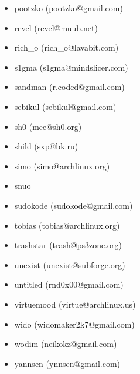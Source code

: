 \begin{itemize}
\item  pootzko (pootzko@gmail.com)
\item  revel (revel@muub.net)
\item  rich\_o (rich\_o@lavabit.com)
\item  s1gma (s1gma@mindslicer.com)
\item  sandman (r.coded@gmail.com)
\item  sebikul (sebikul@gmail.com)
\item  sh0 (mee@sh0.org)
\item  shild (sxp@bk.ru)
\item  simo (simo@archlinux.org)
\item  snuo
\item  sudokode (sudokode@gmail.com)
\item  tobias (tobias@archlinux.org)
\item  trashstar (trash@ps3zone.org)
\item  unexist (unexist@subforge.org)
\item  untitled (rnd0x00@gmail.com)
\item  virtuemood (virtue@archlinux.us)
\item  wido (widomaker2k7@gmail.com)
\item  wodim (neikokz@gmail.com)
\item  yannsen (ynnsen@gmail.com)
\end{itemize}
